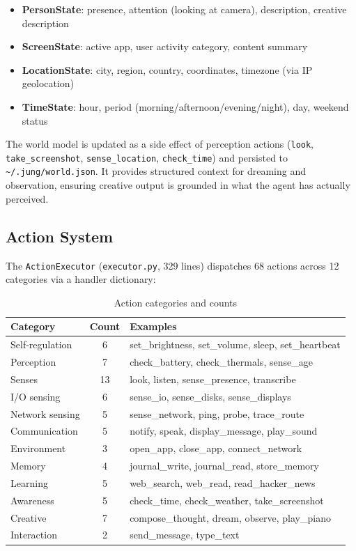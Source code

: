 \documentclass[11pt,oneside]{article}
\begin{document}
\begin{itemize}
  \item \textbf{PersonState}: presence, attention (looking at camera), description, creative description
  \item \textbf{ScreenState}: active app, user activity category, content summary
  \item \textbf{LocationState}: city, region, country, coordinates, timezone (via IP geolocation)
  \item \textbf{TimeState}: hour, period (morning/afternoon/evening/night), day, weekend status
\end{itemize}

The world model is updated as a side effect of perception actions (\texttt{look}, \texttt{take\_screenshot}, \texttt{sense\_location}, \texttt{check\_time}) and persisted to \texttt{\~{}/.jung/world.json}.
It provides structured context for dreaming and observation, ensuring creative output is grounded in what the agent has actually perceived.

\subsection{Action System}

The \texttt{ActionExecutor} (\texttt{executor.py}, 329 lines) dispatches 68 actions across 12 categories via a handler dictionary:

\begin{table}[H]
\centering
\caption{Action categories and counts}
\label{tab:actions}
\small
\begin{tabular}{l c l}
\toprule
\textbf{Category} & \textbf{Count} & \textbf{Examples} \\
\midrule
Self-regulation & 6  & set\_brightness, set\_volume, sleep, set\_heartbeat \\
Perception      & 7  & check\_battery, check\_thermals, sense\_age \\
Senses          & 13 & look, listen, sense\_presence, transcribe \\
I/O sensing     & 6  & sense\_io, sense\_disks, sense\_displays \\
Network sensing & 5  & sense\_network, ping, probe, trace\_route \\
Communication   & 5  & notify, speak, display\_message, play\_sound \\
Environment     & 3  & open\_app, close\_app, connect\_network \\
Memory          & 4  & journal\_write, journal\_read, store\_memory \\
Learning        & 5  & web\_search, web\_read, read\_hacker\_news \\
Awareness       & 5  & check\_time, check\_weather, take\_screenshot \\
Creative        & 7  & compose\_thought, dream, observe, play\_piano \\
Interaction     & 2  & send\_message, type\_text \\
\bottomrule
\end{tabular}
\end{table}
\end{document}
